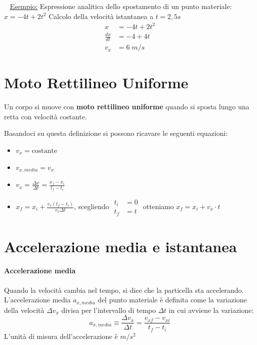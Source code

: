 \documentclass[12pt,oneside]{book}
\begin{document}
~\newline
\underline{Esempio:} \newline
Espressione analitica dello spostamento di un punto materiale: $x=-4t + 2t^2$
Calcolo della velocità istantanea a $t = 2,5s$
\begin{align*}
    x             & = -4t + 2t^2 \\
    \frac{dx}{dt} & = -4 + 4t    \\
    v_x           & = 6 \; m/s
\end{align*}

\section{Moto Rettilineo Uniforme}
Un corpo si muove con \textbf{moto rettilineo uniforme} quando si sposta lungo una retta con velocità costante.

Basandoci su questa definizione si possono ricavare le seguenti equazioni:
\begin{itemize}
    \item $v_x = \text{costante}$
    \item $v_{x,media} = v_x$
    \item $v_x = \frac{\Delta x}{\Delta t} = \frac{x_f - x_i}{t_f - t_i}$
    \item $x_f = x_i + \frac{v_x(t_f - t_i)}{v_x \Delta t}$, scegliendo \tiny $\begin{aligned} t_i&=0 \\ t_f&=t \end{aligned}$ \normalsize otteniamo $x_f = x_i + v_x \cdot t$
\end{itemize}

\section{Accelerazione media e istantanea}

\paragraph{Accelerazione media} Quando la velocità cambia nel tempo, si dice che la particella sta accelerando.
L’accelerazione media $a_{x,media}$ del punto materiale è definita come la variazione della velocità
$\Delta v_x$ divisa per l’intervallo di tempo $\Delta t$ in cui avviene la variazione:
\begin{equation*}
    a_{x,media} \equiv \frac{\Delta v_x}{\Delta t} = \frac{v_{xf} - v_{xi}}{t_f - t_i   }
\end{equation*}
L'unità di misura dell'accelerazione è $m/s^2$
\end{document}

